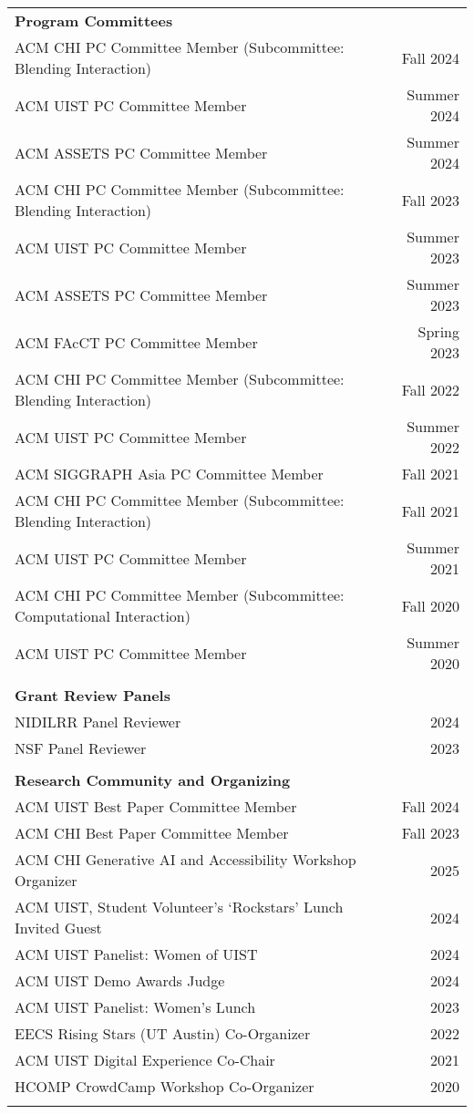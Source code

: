 \begin{longtable}{Xr}
	\textbf{Program Committees} &  \\
	ACM CHI PC Committee Member (Subcommittee: Blending Interaction) & Fall 2024 \\
	ACM UIST PC Committee Member & Summer 2024 \\
	ACM ASSETS PC Committee Member & Summer 2024 \\
	ACM CHI PC Committee Member (Subcommittee: Blending Interaction) & Fall 2023 \\
	ACM UIST PC Committee Member & Summer 2023 \\
	ACM ASSETS PC Committee Member & Summer 2023 \\
	ACM FAcCT PC Committee Member & Spring 2023 \\
	ACM CHI PC Committee Member (Subcommittee: Blending Interaction) & Fall 2022 \\
	ACM UIST PC Committee Member & Summer 2022 \\
	ACM SIGGRAPH Asia PC Committee Member & Fall 2021 \\
	ACM CHI PC Committee Member (Subcommittee: Blending Interaction) & Fall 2021 \\
	ACM UIST PC Committee Member & Summer 2021 \\
	ACM CHI PC Committee Member (Subcommittee: Computational Interaction) & Fall 2020 \\
	ACM UIST PC Committee Member & Summer 2020 \\
	\\

	\textbf{Grant Review Panels} &  \\
	NIDILRR Panel Reviewer & 2024 \\
	NSF Panel Reviewer & 2023 \\
	\\

	\textbf{Research Community and Organizing} &  \\
	ACM UIST Best Paper Committee Member & Fall 2024 \\
	ACM CHI Best Paper Committee Member & Fall 2023 \\
	ACM CHI Generative AI and Accessibility Workshop Organizer & 2025 \\
	ACM UIST, Student Volunteer's `Rockstars' Lunch Invited Guest & 2024 \\
	ACM UIST Panelist: Women of UIST & 2024 \\
	ACM UIST Demo Awards Judge & 2024 \\
	ACM UIST Panelist: Women's Lunch & 2023 \\
	EECS Rising Stars (UT Austin) Co-Organizer & 2022 \\
	ACM UIST Digital Experience Co-Chair & 2021 \\
	HCOMP CrowdCamp Workshop Co-Organizer & 2020 \\
	\\


\end{longtable}

